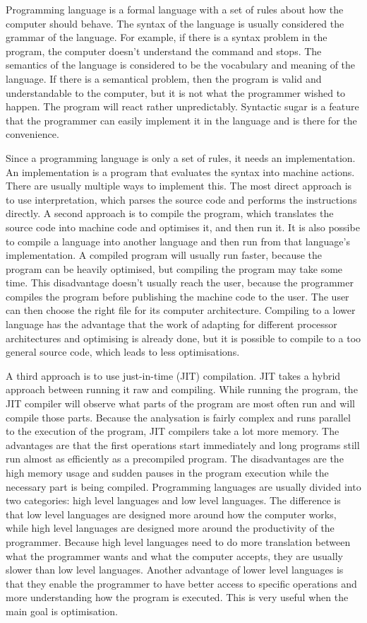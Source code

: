 Programming language is a formal language with a set of rules about how the computer should behave. The syntax of the language is usually considered the grammar of the language. For example, if there is a syntax problem in the program, the computer doesn't understand the command and stops. The semantics of the language is considered to be the vocabulary and meaning of the language. If there is a semantical problem, then the program is valid and understandable to the computer, but it is not what the programmer wished to happen. The program will react rather unpredictably. Syntactic sugar is a feature that the programmer can easily implement it in the language and is there for the convenience.

Since a programming language is only a set of rules, it needs an implementation. An implementation is a program that evaluates the syntax into machine actions. There are usually multiple ways to implement this. The most direct approach is to use interpretation, which parses the source code and performs the instructions directly. A second approach is to compile the program, which translates the source code into machine code and optimises it, and then run it. It is also possibe to compile a language into another language and then run from that language's implementation. A compiled program will usually run faster, because the program can be heavily optimised, but compiling the program may take some time. This disadvantage doesn't usually reach the user, because the programmer compiles the program before  publishing the machine code to the user. The user can then choose the right file for its computer architecture. Compiling to a lower language has the advantage that the work of adapting for different processor architectures and optimising is already done, but it is possible to compile to a too general source code, which leads to less optimisations.

A third approach is to use just-in-time (JIT) compilation. JIT takes a hybrid
approach between running it raw and compiling. While running the program, the
JIT compiler will observe what parts of the program are most often run and will
compile those parts. Because the analysation is fairly complex and runs parallel
to the execution of the program, JIT compilers take a lot more
memory.\cite{website:jit-memory} The advantages are that the first operations start
immediately and long programs still run almost as efficiently as a precompiled program. The disadvantages are the high memory usage and sudden pauses in the program execution while the necessary part is being compiled.
Programming languages are usually divided into two categories: high level languages and low level languages. The difference is that low level languages are designed more around how the computer works, while high level languages are designed more around the productivity of the programmer. Because high level languages need to do more translation between what the programmer wants and what the computer accepts, they are usually slower than low level languages. Another advantage of lower level languages is that they enable the programmer to have better access to specific operations and more understanding how the program is executed. This is very useful when the main goal is optimisation.

